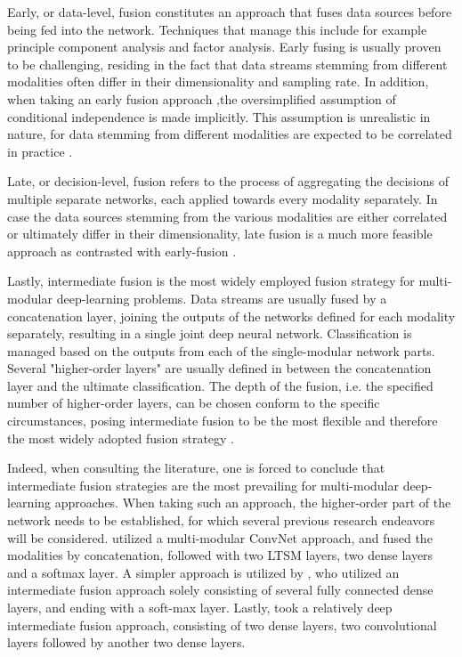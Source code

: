 \documentclass[12pt]{article}
\begin{document}
Early, or data-level, fusion constitutes an approach that fuses data sources before being fed into the network. Techniques that manage this include for example principle component analysis and factor analysis. Early fusing is usually proven to be challenging, residing in the fact that data streams stemming from different modalities often differ in their dimensionality and sampling rate. In addition, when taking an early fusion approach ,the oversimplified assumption of conditional independence is made implicitly. This assumption is unrealistic in nature, for data stemming from different modalities are expected to be correlated in practice \cite{ramachandram2017deep}. 

Late, or decision-level, fusion refers to the process of aggregating the decisions of multiple separate networks, each applied towards every modality separately. In case the data sources stemming from the various modalities are either correlated or ultimately differ in their dimensionality, late fusion is a much more feasible approach as contrasted with early-fusion \cite{ramachandram2017deep}.

Lastly, intermediate fusion is the most widely employed fusion strategy for multi-modular deep-learning problems. Data streams are usually fused by a concatenation layer, joining the outputs of the networks defined for each modality separately, resulting in a single joint deep neural network. Classification is managed based on the outputs from each of the single-modular network parts. Several "higher-order layers" are usually defined in between the concatenation layer and the ultimate classification. The depth of the fusion, i.e. the specified number of higher-order layers, can be chosen conform to the specific circumstances, posing intermediate fusion to be the most flexible and therefore the most widely adopted fusion strategy \cite{ramachandram2017deep}.

Indeed, when consulting the literature, one is forced to conclude that intermediate fusion strategies are the most prevailing for multi-modular deep-learning approaches. When taking such an approach, the higher-order part of the network needs to be established, for which several previous research endeavors will be considered.   utilized a multi-modular ConvNet approach, and fused the modalities by concatenation, followed with two LTSM layers, two dense layers and a softmax layer. A simpler approach is utilized by , who utilized an intermediate fusion approach solely consisting of several fully connected dense layers, and ending with a soft-max layer. Lastly,  took a relatively deep intermediate fusion approach, consisting of two dense layers, two convolutional layers followed by another two dense layers.  
\end{document}
